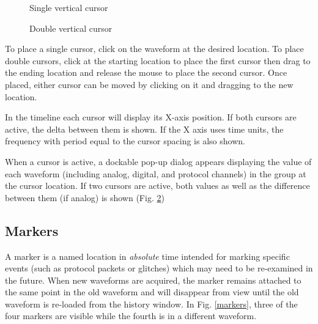 \begin{figure}[H]
\centering
{}
\caption{Single vertical cursor}
\label{vertical-cursor}
\end{figure}

\begin{figure}[H]
\centering
{}
\caption{Double vertical cursor}
\label{vertical-cursor-x2}
\end{figure}

To place a single cursor, click on the waveform at the desired location. To place double cursors, click at the starting
location to place the first cursor then drag to the ending location and release the mouse to place the second cursor.
Once placed, either cursor can be moved by clicking on it and dragging to the new location.


In the timeline each cursor will display its X-axis position. If both cursors are active, the delta between them
is shown. If the X axis uses time units, the frequency with period equal to the cursor spacing is also shown.

When a cursor is active, a dockable pop-up dialog appears displaying the value of each waveform (including analog,
digital, and protocol channels) in the group at the cursor location. If two cursors are active, both values as well as
the difference between them (if analog) is shown (Fig. \ref{vertical-cursor-x2})

\subsection{Markers}
\label{sec:markers}

A marker is a named location in \emph{absolute} time intended for marking specific events (such as protocol packets or
glitches) which may need to be re-examined in the future. When new waveforms are acquired, the marker remains attached
to the same point in the old waveform and will disappear from view until the old waveform is re-loaded from the history
window. In Fig. \ref{markers}, three of the four markers are visible while the fourth is in a different waveform.

